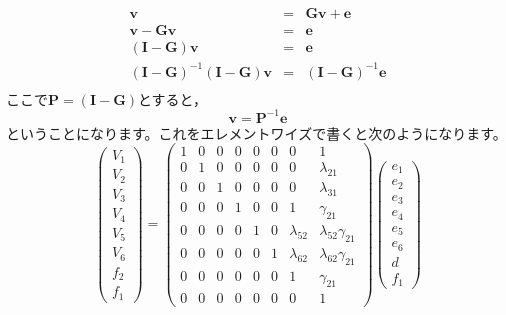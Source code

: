 \documentclass{ltjsbook}
\begin{document}
\begin{eqnarray*}
	\bm{v} &=& \bm{Gv}+\bm{e}\\
	\bm{v}-\bm{Gv} &=& \bm{e}\\
	(\bm{I}-\bm{G})\bm{v} &=& \bm{e}\\
	(\bm{I}-\bm{G})^{-1}(\bm{I}-\bm{G})\bm{v} &=& (\bm{I}-\bm{G})^{-1}\bm{e}\\
\end{eqnarray*}
ここで$\bm{P} = (\bm{I}-\bm{G})$とすると，
\[ \bm{v} = \bm{P}^{-1}\bm{e} \]
ということになります。これをエレメントワイズで書くと次のようになります。
\[
	\begin{pmatrix} V_1 \\ V_2 \\ V_3 \\ V_4 \\ V_5 \\ V_6 \\ f_2 \\f_1 \end{pmatrix} =
	\begin{pmatrix} 1 & 0 & 0 & 0 & 0 & 0 & 0            & 1                       \\
                0 & 1 & 0 & 0 & 0 & 0 & 0            & \lambda_{21}            \\
                0 & 0 & 1 & 0 & 0 & 0 & 0            & \lambda_{31}            \\
                0 & 0 & 0 & 1 & 0 & 0 & 1            & \gamma_{21}             \\
                0 & 0 & 0 & 0 & 1 & 0 & \lambda_{52} & \lambda_{52}\gamma_{21} \\
                0 & 0 & 0 & 0 & 0 & 1 & \lambda_{62} & \lambda_{62}\gamma_{21} \\
                0 & 0 & 0 & 0 & 0 & 0 & 1            & \gamma_{21}             \\
                0 & 0 & 0 & 0 & 0 & 0 & 0            & 1\end{pmatrix}
	\begin{pmatrix} e_1 \\ e_2 \\ e_3 \\ e_4 \\ e_5 \\ e_6 \\ d \\f_1 \end{pmatrix}
\]
\end{document}
